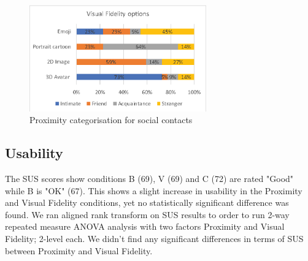 


\begin{figure}[ht]
	\centering
	\includegraphics[width=3in]{images/analysis-images-01.eps}
	\caption{Proximity categorisation for social contacts}
	\label{fig:contacts:proximity}
\end{figure}

\subsection{Usability}

The SUS scores 
show conditions B (69), V (69) and C (72) are rated "Good" while B is "OK" (67). This shows a slight increase in usability in the Proximity and Visual Fidelity conditions, yet no statistically significant difference was found. 
We ran aligned rank transform on SUS results to order to run 2-way repeated measure ANOVA analysis with two factors Proximity and Visual Fidelity; 2-level each. We didn't find any significant differences in terms of SUS between Proximity and Visual Fidelity. 

